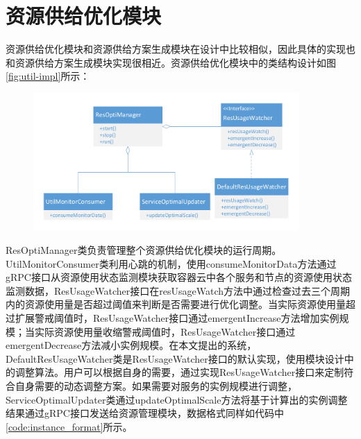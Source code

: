 \section{资源供给优化模块}
资源供给优化模块和资源供给方案生成模块在设计中比较相似，因此具体的实现也和资源供给方案生成模块实现很相近。资源供给优化模块中的类结构设计如图\ref{fig:util-impl}所示：
\begin{figure}[H]
\centering
\includegraphics[width=0.9\textwidth]{./figure/optimize_impl}
\end{figure}
ResOptiManager类负责管理整个资源供给优化模块的运行周期。UtilMonitorConsumer类利用心跳的机制，使用consumeMonitorData方法通过gRPC接口从资源使用状态监测模块获取容器云中各个服务和节点的资源使用状态监测数据，ResUsageWatcher接口在resUsageWatch方法中通过检查过去三个周期内的资源使用量是否超过阈值来判断是否需要进行优化调整。当实际资源使用量超过扩展警戒阈值时，ResUsageWatcher接口通过emergentIncrease方法增加实例规模；当实际资源使用量收缩警戒阈值时，ResUsageWatcher接口通过emergentDecrease方法减小实例规模。在本文提出的系统，DefaultResUsageWatcher类是ResUsageWatcher接口的默认实现，使用模块设计中的调整算法。用户可以根据自身的需要，通过实现ResUsageWatcher接口来定制符合自身需要的动态调整方案。如果需要对服务的实例规模进行调整，ServiceOptimalUpdater类通过updateOptimalScale方法将基于计算出的实例调整结果通过gRPC接口发送给资源管理模块，数据格式同样如代码中\ref{code:instance_format}所示。

